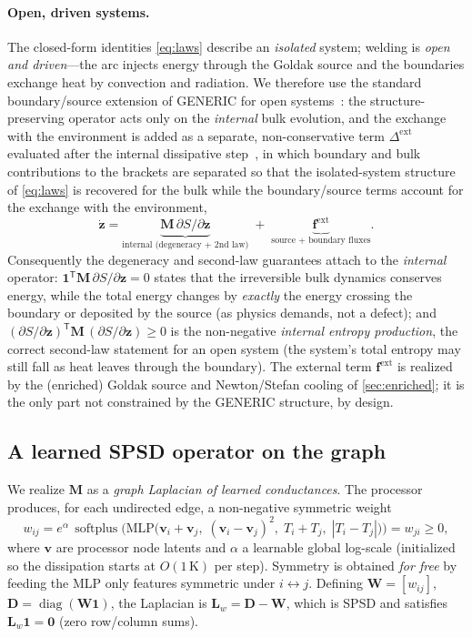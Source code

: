 \documentclass[11pt]{article}
\newcommand{\T}{\mathsf{T}}                 %
\newcommand{\Lw}{\bm{L}_{\!w}}
\newcommand{\softplus}{\operatorname{softplus}}
\newcommand{\abs}[1]{\left\lvert#1\right\rvert}
\theoremstyle{definition}
\begin{document}
\paragraph{Open, driven systems.}
The closed-form identities \cref{eq:laws} describe an \emph{isolated} system; welding is
\emph{open and driven}---the arc injects energy through the Goldak source and the
boundaries exchange heat by convection and radiation. We therefore use the standard
boundary/source extension of GENERIC for open systems~\cite{ottinger2005beyond}: the
structure-preserving operator acts only on the \emph{internal} bulk evolution, and the
exchange with the environment is added as a separate, non-conservative term
$\Delta^{\mathrm{ext}}$ evaluated after the internal dissipative
step~\cite{ottinger2006open,ottinger2005beyond}, in which boundary and bulk
contributions to the brackets are separated so that the isolated-system structure of
\cref{eq:laws} is recovered for the bulk while the boundary/source terms account for the
exchange with the environment,
\begin{equation}
  \dot{\bm z}=\underbrace{\bm M\,\partial S/\partial\bm z}_{\text{internal (degeneracy + 2nd law)}}
  \;+\;\underbrace{\bm f^{\mathrm{ext}}}_{\text{source + boundary fluxes}}.
  \label{eq:opengeneric}
\end{equation}
Consequently the degeneracy and second-law guarantees attach to the \emph{internal}
operator: $\bm 1^\T\bm M\,\partial S/\partial\bm z=0$ states that the irreversible bulk
dynamics conserves energy, while the total energy changes by \emph{exactly} the energy
crossing the boundary or deposited by the source (as physics demands, not a defect); and
$(\partial S/\partial\bm z)^\T\bm M\,(\partial S/\partial\bm z)\ge0$ is the non-negative
\emph{internal entropy production}, the correct second-law statement for an open system
(the system's total entropy may still fall as heat leaves through the boundary). The
external term $\bm f^{\mathrm{ext}}$ is realized by the (enriched) Goldak source and
Newton/Stefan cooling of \cref{sec:enriched}; it is the only part not constrained by the
GENERIC structure, by design.

\subsection{A learned SPSD operator on the graph}

We realize $\bm M$ as a \emph{graph Laplacian of learned conductances}. The processor
produces, for each undirected edge, a non-negative symmetric weight
\begin{equation}
  w_{ij} = e^{\alpha}\,\softplus\!\Big(\mathrm{MLP}\big(
    \bm v_i+\bm v_j,\;(\bm v_i-\bm v_j)^2,\;T_i+T_j,\;\abs{T_i-T_j}\big)\Big)
  = w_{ji}\ge 0,
  \label{eq:conductance}
\end{equation}
where $\bm v$ are processor node latents and $\alpha$ a learnable global log-scale
(initialized so the dissipation starts at $O(1\,\mathrm K)$ per step). Symmetry is
obtained \emph{for free} by feeding the MLP only features symmetric under
$i\leftrightarrow j$. Defining $\bm W=[w_{ij}]$, $\bm D=\operatorname{diag}(\bm W\bm 1)$,
the Laplacian is $\Lw=\bm D-\bm W$, which is SPSD and satisfies $\Lw\bm 1=\bm 0$ (zero
row/column sums).
\end{document}
